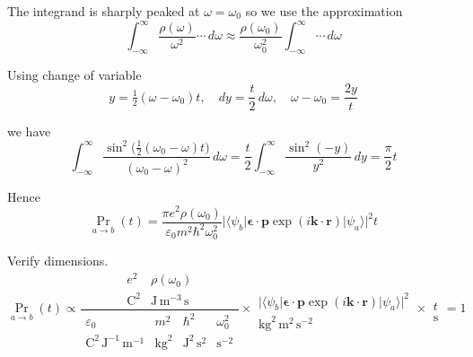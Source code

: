 The integrand is sharply peaked at $\omega=\omega_0$ so we use the approximation
\begin{equation*}
\int_{-\infty}^\infty\frac{\rho(\omega)}{\omega^2}
\cdots
\,d\omega
\approx\frac{\rho(\omega_0)}{\omega_0^2}
\int_{-\infty}^\infty
\cdots
\,d\omega
\end{equation*}

Using change of variable
\begin{equation*}
y=\tfrac{1}{2}(\omega-\omega_0)t,\quad
dy=\frac{t}{2}\,d\omega,\quad
\omega-\omega_0=\frac{2y}{t}
\end{equation*}

we have
\begin{equation*}
\int_{-\infty}^\infty
\frac{\sin^2\bigl(\tfrac{1}{2}(\omega_0-\omega)t\bigr)}{(\omega_0-\omega)^2}\,d\omega
=\frac{t}{2}\int_{-\infty}^\infty\frac{\sin^2(-y)}{y^2}\,dy
=\frac{\pi}{2}t
\end{equation*}

Hence
\begin{equation*}
\Pr_{a\rightarrow b}(t)
=\frac{\pi e^2\rho(\omega_0)}{\varepsilon_0m^2\hbar^2\omega_0^2}
\bigl|\langle\psi_b|\boldsymbol{\epsilon}\cdot\mathbf p\exp(i\mathbf k\cdot\mathbf r)|\psi_a\rangle\bigr|^2
t
\end{equation*}

Verify dimensions.
\begin{equation*}
\Pr_{a\rightarrow b}(t)\propto
\frac{\begin{matrix}
e^2 & \rho(\omega_0)
\\
\text{C}^2 & \text{J}\,\text{m}^{-3}\,\text{s}
\end{matrix}
}{\begin{matrix}
\varepsilon_0 & m^2 & \hbar^2 & \omega_0^2
\\
\text{C}^2\,\text{J}^{-1}\,\text{m}^{-1}
& \text{kg}^2 & \text{J}^2\,\text{s}^2 & \text{s}^{-2}
\end{matrix}}
\times
\begin{matrix}
\\
\bigl|\langle\psi_b|\boldsymbol{\epsilon}\cdot\mathbf p\exp(i\mathbf k\cdot\mathbf r)|\psi_a\rangle\bigr|^2
\\
\text{kg}^2\,\text{m}^2\,\text{s}^{-2}
\end{matrix}
\times
\begin{matrix}
\\
t
\\
\text{s}
\end{matrix}
=1
\end{equation*}


